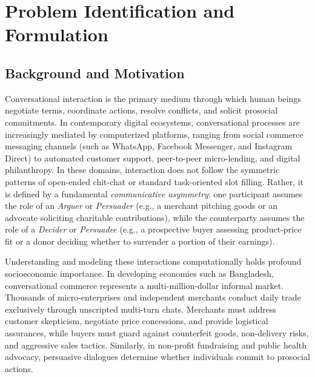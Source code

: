 \chapter{Problem Identification and Formulation}
\label{ch:problem}

\section{Background and Motivation}
\label{sec:background}

Conversational interaction is the primary medium through which human beings negotiate terms, coordinate actions, resolve conflicts, and solicit prosocial commitments. In contemporary digital ecosystems, conversational processes are increasingly mediated by computerized platforms, ranging from social commerce messaging channels (such as WhatsApp, Facebook Messenger, and Instagram Direct) to automated customer support, peer-to-peer micro-lending, and digital philanthropy. In these domains, interaction does not follow the symmetric patterns of open-ended chit-chat or standard task-oriented slot filling. Rather, it is defined by a fundamental \textit{communicative asymmetry}: one participant assumes the role of an \textit{Arguer} or \textit{Persuader} (e.g., a merchant pitching goods or an advocate soliciting charitable contributions), while the counterparty assumes the role of a \textit{Decider} or \textit{Persuadee} (e.g., a prospective buyer assessing product-price fit or a donor deciding whether to surrender a portion of their earnings).

Understanding and modeling these interactions computationally holds profound socioeconomic importance. In developing economies such as Bangladesh, conversational commerce represents a multi-million-dollar informal market. Thousands of micro-enterprises and independent merchants conduct daily trade exclusively through unscripted multi-turn chats. Merchants must address customer skepticism, negotiate price concessions, and provide logistical assurances, while buyers must guard against counterfeit goods, non-delivery risks, and aggressive sales tactics. Similarly, in non-profit fundraising and public health advocacy, persuasive dialogues determine whether individuals commit to prosocial actions. 

